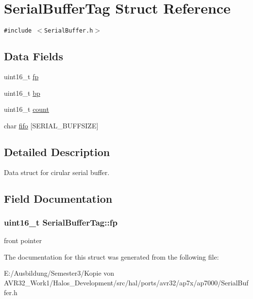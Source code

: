 \hypertarget{struct_serial_buffer_tag}{
\section{SerialBufferTag Struct Reference}
\label{struct_serial_buffer_tag}
}
{\tt \#include $<$SerialBuffer.h$>$}

\subsection*{Data Fields}
\begin{CompactItemize}
\item 
uint16\_\-t \hyperlink{struct_serial_buffer_tag_b77e7a0f55cc8955303b09508bbc22b5}{fp}
\item 
uint16\_\-t \hyperlink{group__serialbuffer_g80fec57b0c1089e49be601c8e154011f}{bp}
\item 
uint16\_\-t \hyperlink{group__serialbuffer_gf764ad82a3af5651722c23326f28adbd}{count}
\item 
char \hyperlink{group__serialbuffer_g0cbebf4bc14ed97a7d673795fccb8f26}{fifo} \mbox{[}SERIAL\_\-BUFFSIZE\mbox{]}
\end{CompactItemize}


\subsection{Detailed Description}
Data struct for cirular serial buffer. 

\subsection{Field Documentation}
\hypertarget{struct_serial_buffer_tag_b77e7a0f55cc8955303b09508bbc22b5}{
\subsubsection[{fp}]{\setlength{\rightskip}{0pt plus 5cm}uint16\_\-t {\bf SerialBufferTag::fp}}}
\label{struct_serial_buffer_tag_b77e7a0f55cc8955303b09508bbc22b5}


front pointer 

The documentation for this struct was generated from the following file:\begin{CompactItemize}
\item 
E:/Ausbildung/Semester3/Kopie von AVR32\_\-Work1/Halos\_\-Development/src/hal/ports/avr32/ap7x/ap7000/SerialBuffer.h\end{CompactItemize}
